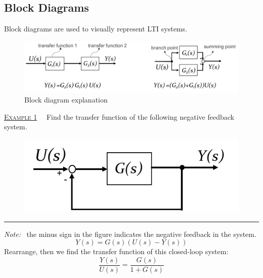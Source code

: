 \documentclass[12pt,a4paper]{article}
\begin{document}
\subsection{Block Diagrams}
Block diagrams are used to visually represent LTI systems.
\begin{figure}[H] \centering
\includegraphics[width=.9\textwidth]{images/block_diagram.pdf}
\caption{Block diagram explanation}
\end{figure}
\begin{tcolorbox}[breakable]%
\underline{\textsc{Example 1}} \ \ Find the transfer function of the following negative feedback system.
\begin{figure}[H] \centering
\includegraphics[width=.4\textwidth]{images/BD1.pdf}
\end{figure}
 \hrule \vspace{.3cm} 
\textit{Note:} \  the minus sign in the figure indicates the negative feedback in the system.
\[ Y(s) = G(s)(U(s)-Y(s))\]
Rearrange, then we find the transfer function of this closed-loop system:
\[\boxed{\frac{Y(s)}{U(s)} = \frac{G(s)}{1+G(s)}}\]
\end{tcolorbox}
\end{document}
